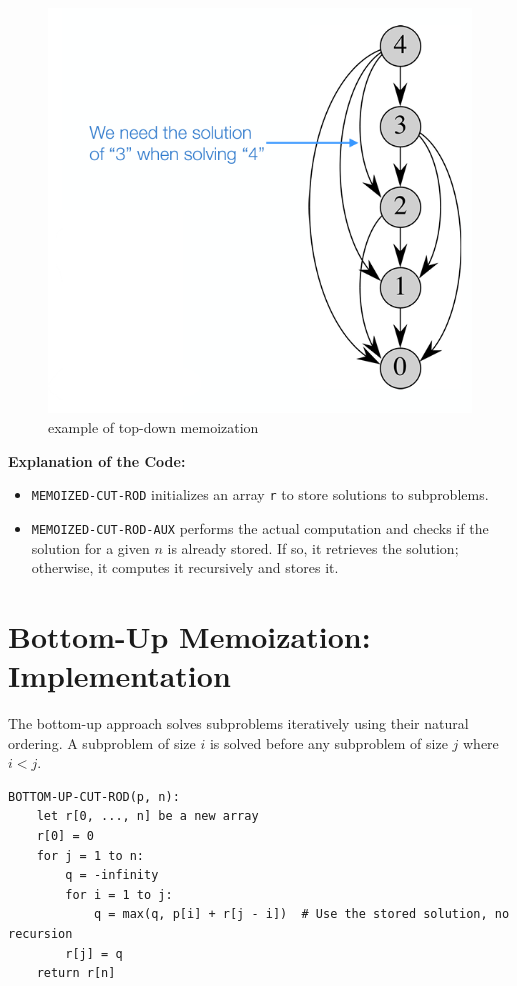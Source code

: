 \begin{figure}[h]
    \centering
    \includegraphics[width=0.75\linewidth]{immagini//capitolo 13/13_4.png}
    \caption{example of top-down memoization}
    \label{fig:enter-label}
\end{figure}

\textbf{Explanation of the Code:}
\begin{itemize}
    \item \texttt{MEMOIZED-CUT-ROD} initializes an array \texttt{r} to store solutions to subproblems.
    \item \texttt{MEMOIZED-CUT-ROD-AUX} performs the actual computation and checks if the solution for a given \(n\) is already stored. If so, it retrieves the solution; otherwise, it computes it recursively and stores it.
\end{itemize}
\newpage

\section{Bottom-Up Memoization: Implementation}

The bottom-up approach solves subproblems iteratively using their natural ordering. A subproblem of size \(i\) is solved before any subproblem of size \(j\) where \(i < j\).

\begin{verbatim}
BOTTOM-UP-CUT-ROD(p, n):
    let r[0, ..., n] be a new array
    r[0] = 0
    for j = 1 to n:
        q = -infinity
        for i = 1 to j:
            q = max(q, p[i] + r[j - i])  # Use the stored solution, no recursion
        r[j] = q
    return r[n]
\end{verbatim}

